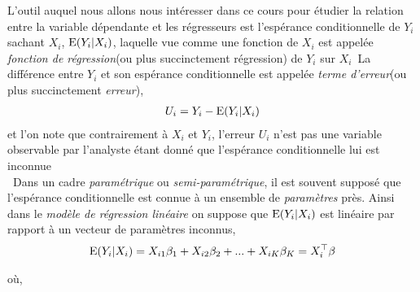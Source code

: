 L'outil auquel nous allons nous intéresser dans ce cours pour étudier la relation entre la variable dépendante et les régresseurs est l'espérance conditionnelle de $Y_i$ sachant $X_i$, $\operatorname{E}(Y_i| X_i)$, laquelle vue comme une fonction de $X_i$ est appelée \emph{fonction de régression}(ou plus succinctement régression) de $Y_i$ sur $X_i$\
La différence entre $Y_i$ et son espérance conditionnelle est appelée \emph{terme d'erreur}(ou plus succinctement \emph{erreur}),
\begin{align}
U_i = Y_i - \operatorname{E}(Y_i| X_i)
\label{eq1}
\end{align} 
 et l'on note que contrairement à $X_i$ et $Y_i$, l'erreur $U_i$ n'est pas une variable observable par l'analyste étant donné que l'espérance conditionnelle lui est inconnue\\\
Dans un cadre \emph{paramétrique} ou \emph{semi-paramétrique}, il est souvent supposé que l'espérance conditionnelle est connue à un ensemble de \emph{paramètres} près. Ainsi dans le \emph{modèle de régression linéaire} on suppose que $\operatorname{E}(Y_i|X_i)$ est linéaire par rapport à un vecteur de paramètres inconnus,
\begin{align}
\operatorname{E}(Y_i|X_i) = X_{i1}\beta_1 +  X_{i2}\beta_2 + ...+ X_{iK}\beta_K = X_i^\top\beta
\label{eq2}
\end{align}

où,

